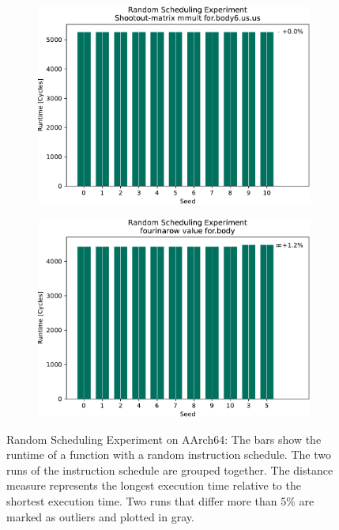 \begin{figure}
    \vspace{0.5cm}
    \begin{subfigure}{0.0325\textwidth}\caption{}\label{fig:eval:rndm:aarch64:e}\end{subfigure}
    \begin{subfigure}{0.44\textwidth}
        \includegraphics[width=\textwidth]{img/random-scheduling-experiment-pi-collected/Shootout-matrix-crop.pdf}
    \end{subfigure}
    \hfill
    \begin{subfigure}{0.0325\textwidth}\caption{}\label{fig:eval:rndm:aarch64:f}\end{subfigure}
    \begin{subfigure}{0.44\textwidth}
        \includegraphics[width=\textwidth]{img/random-scheduling-experiment-pi-collected/fourinarow-crop.pdf}
    \end{subfigure}

    \caption[Random Scheduling Experiment on AArch64]{Random Scheduling Experiment on AArch64:
    The bars show the runtime of a function with a random instruction schedule.
    The two runs of the instruction schedule are grouped together.
    The distance measure represents the longest execution time relative to the shortest execution time.
    Two runs that differ more than 5\% are marked as outliers and plotted in gray.}
    \label{fig:eval:rndm:aarch64}
\end{figure}
